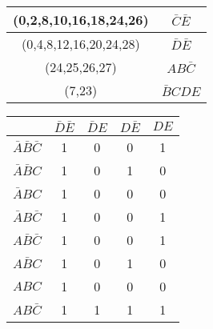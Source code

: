     \pagebreak

    \begin{table}[H]
        \begin{center}
            \def\arraystretch{1.5}
            \begin{tabular}{|c|c|}
                \hline
                (0,2,8,10,16,18,24,26) &	$\bar{C}\bar{E}$ \\
                \hline
                (0,4,8,12,16,20,24,28) & $\bar{D}\bar{E}$ \\
                \hline  
                (24,25,26,27) & $AB\bar{C}$ \\
                \hline   
                (7,23) & $\bar{B}CDE$ \\
                \hline           
                
            \end{tabular}
        \end{center}

    \end{table}

    \pagebreak
    
    \begin{table}[H]
        \begin{center}
            \def\arraystretch{1.5}
            \begin{tabular}{|c|c|c|c|c|}
                \hline
                &	$\bar{D}\bar{E}$ &	$\bar{D}E$ &	$D\bar{E}$ & $DE$ \\
                \hline
                $\bar{A}\bar{B}\bar{C}$ & 1 & 0 & 0 & 1 \\
                \hline          
                $\bar{A}\bar{B}C$ & 1 & 0 & 1 & 0 \\
                \hline   
                $\bar{A}BC$ & 1 & 0 & 0 & 0 \\
                \hline     
                $\bar{A}B\bar{C}$  & 1 & 0 & 0 & 1 \\
                \hline
                
                $A\bar{B}\bar{C}$ & 1 & 0 & 0 & 1 \\
                
                \hline
                
                $A\bar{B}C$ & 1 & 0 & 1 & 0 \\
                \hline
                
                $ABC$ & 1 & 0 & 0 & 0 \\
                \hline
                
                $AB\bar{C}$ & 1 & 1 & 1 & 1 \\
                \hline
                
            \end{tabular}
        \end{center}

    \end{table}

